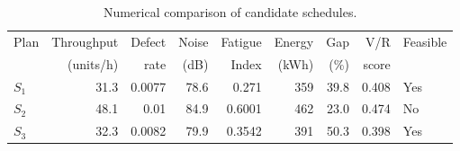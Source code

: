\begin{table}[htbp]
\centering
\caption{Numerical comparison of candidate schedules.}
\label{tab:numerical-sim}
\small
\begin{tabular}{@{}lrrrrrrrl@{}}
\toprule
Plan & Throughput & Defect & Noise & Fatigue & Energy & Gap & V/R & Feasible \\
     & (units/h)  & rate   & (dB)  & Index   & (kWh)  & (\%) & score &         \\
\midrule
$S_{1}$ & 31.3 & 0.0077 & 78.6 & 0.271 & 359 & 39.8 & 0.408 & Yes \\
$S_{2}$ & 48.1 & 0.01 & 84.9 & 0.6001 & 462 & 23.0 & 0.474 & No \\
$S_{3}$ & 32.3 & 0.0082 & 79.9 & 0.3542 & 391 & 50.3 & 0.398 & Yes \\
\bottomrule
\end{tabular}
\end{table}
